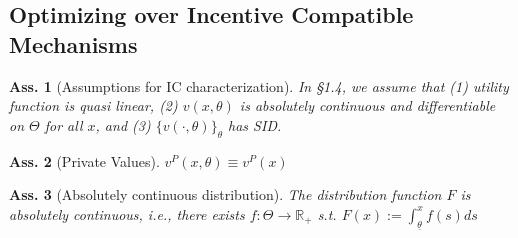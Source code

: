 \documentclass[11pt,a4paper,dvipdfmx]{article}
\theoremstyle{plain}
\newtheorem{ass}{Ass.}
\newcommand{\R}{\mathbb{R}}
\newcommand{\1}{\mathbbm{1}}
\begin{document}
\subsection{Optimizing over Incentive Compatible Mechanisms}
\begin{ass}[Assumptions for IC characterization]
	In \S1.4, we assume that (1) utility function is quasi linear, (2) $v(x, \theta)$ is absolutely continuous and differentiable on $\Theta$ for all $x$, and (3) $\{v(\cdot, \theta)\}_\theta$ has SID.
\end{ass}
\begin{ass}[Private Values]
	$v^P(x, \theta) \equiv v^P(x)$
\end{ass}
\begin{ass}[Absolutely continuous distribution]
	The distribution function $F$ is absolutely continuous, i.e., 
	there exists $f:\Theta \to \R_+$ s.t. $F(x) := \int_{\underline{\theta}}^x f(s) ds$
\end{ass}
\end{document}

